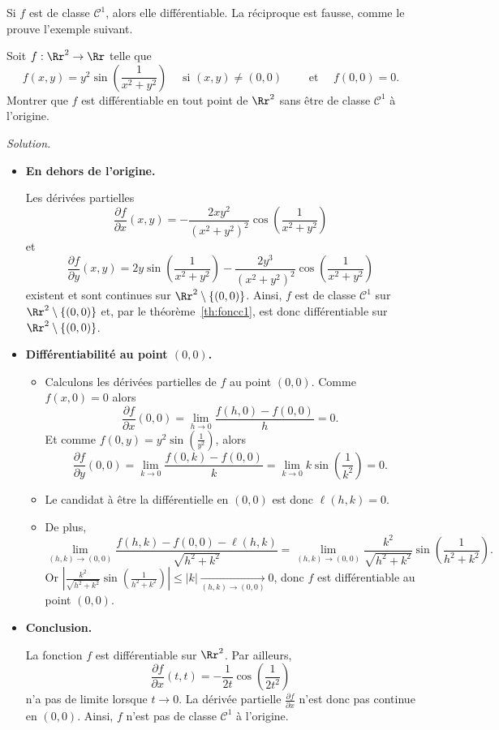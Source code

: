 Si $f$ est de classe $\mathcal{C}^1$, alors elle différentiable. La réciproque est fausse, comme le prouve l'exemple suivant.

\begin{exemple}{}{}
	Soit $f:\Rr^2\to \Rr$ telle que
	$$f(x,y)=y^2\sin \left(\frac{1}{x^2+y^2}\right)\quad \text{ si }(x,y)\neq (0,0)\qquad \text{ et }\quad f(0,0)=0.$$
	Montrer que $f$ est différentiable en tout point de $\Rr^2$ sans être de classe $\mathscr{C}^1$ à l'origine.
	
	\bigskip
	\emph{Solution.}
	
	
	\begin{itemize}
		\item \textbf{En dehors de l'origine.}
		
		Les dérivées partielles 
		$$\frac{\partial f}{\partial x}(x,y)=-\frac{2xy^2}{(x^2+y^2)^2}\cos \left(\frac{1}{x^2+y^2}\right)$$
		et
		$$\frac{\partial f}{\partial y}(x,y)=2y\sin \left(\frac{1}{x^2+y^2}\right)-\frac{2y^3}{(x^2+y^2)^2}\cos \left(\frac{1}{x^2+y^2}\right)$$
		existent et sont continues sur $\Rr^2\setminus \{(0,0)\}$. 
		Ainsi, $f$ est de classe $\mathscr{C}^1$ sur $\Rr^2\setminus \{(0,0)\}$ et, par le théorème~\ref{th:foncc1}, est donc différentiable sur $\Rr^2\setminus \{(0,0)\}$.
		
		
		\item \textbf{Différentiabilité au point $(0,0)$.} 
		\begin{itemize}
			\item Calculons les dérivées partielles de $f$ au point $(0,0)$. Comme $f(x,0)=0$ alors 
			$$\frac{\partial f}{\partial x}(0,0)=\lim _{h\to 0}\frac{f(h,0)-f(0,0)}{h}=0.$$
			Et comme $f(0,y) = y^2\sin \left(\frac{1}{y^2}\right)$, alors 
			$$\frac{\partial f}{\partial y}(0,0) = \lim _{k\to 0}\frac{f(0,k)-f(0,0)}{k}=\lim _{k\to 0}k\sin \left(\frac{1}{k^2}\right)=0.$$
			\item Le candidat à être la différentielle en $(0,0)$ est donc $\ell(h,k) = 0$. 
			\item De plus,
			$$\lim _{(h,k)\to (0,0)}\frac{f(h,k)-f(0,0)-\ell(h,k)}{\sqrt{h^2+k^2}}=\lim _{(h,k)\to (0,0)}\frac{k^2}{\sqrt{h^2+k^2}}\sin \left(\frac{1}{h^2+k^2}\right).$$
			Or $\displaystyle \left|\frac{k^2}{\sqrt{h^2+k^2}}\sin \left(\frac{1}{h^2+k^2}\right)\right|\le |k| \xrightarrow[(h,k)\to(0,0)]{} 0$, donc $f$ est différentiable au point $(0,0)$.
		\end{itemize}
		\item \textbf{Conclusion.} 
		
		La fonction $f$ est différentiable sur $\Rr^2$. Par ailleurs, 
		$$\frac{\partial f}{\partial x}(t,t)=-\frac{1}{2t}\cos \left(\frac{1}{2t^2}\right)$$ 
		n'a pas de limite lorsque $t\to0$. La dérivée partielle $\frac{\partial f}{\partial x}$ n'est donc pas continue en $(0,0)$. Ainsi, $f$ n'est pas de classe $\mathcal{C}^1$ à l'origine.
		
	\end{itemize}
\end{exemple}



